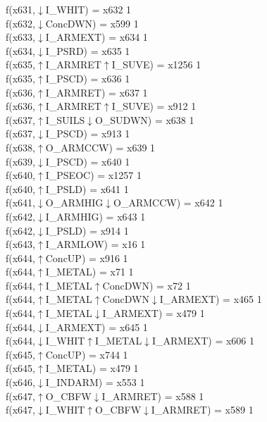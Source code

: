 f(x631,$\downarrow$I\_WHIT) = x632 {1} \\
f(x632,$\downarrow$ConcDWN) = x599 {1} \\
f(x633,$\downarrow$I\_ARMEXT) = x634 {1} \\
f(x634,$\downarrow$I\_PSRD) = x635 {1} \\
f(x635,$\uparrow$I\_ARMRET$\uparrow$I\_SUVE) = x1256 {1} \\
f(x635,$\uparrow$I\_PSCD) = x636 {1} \\
f(x636,$\uparrow$I\_ARMRET) = x637 {1} \\
f(x636,$\uparrow$I\_ARMRET$\uparrow$I\_SUVE) = x912 {1} \\
f(x637,$\uparrow$I\_SUILS$\downarrow$O\_SUDWN) = x638 {1} \\
f(x637,$\downarrow$I\_PSCD) = x913 {1} \\
f(x638,$\uparrow$O\_ARMCCW) = x639 {1} \\
f(x639,$\downarrow$I\_PSCD) = x640 {1} \\
f(x640,$\uparrow$I\_PSEOC) = x1257 {1} \\
f(x640,$\uparrow$I\_PSLD) = x641 {1} \\
f(x641,$\downarrow$O\_ARMHIG$\downarrow$O\_ARMCCW) = x642 {1} \\
f(x642,$\downarrow$I\_ARMHIG) = x643 {1} \\
f(x642,$\downarrow$I\_PSLD) = x914 {1} \\
f(x643,$\uparrow$I\_ARMLOW) = x16 {1} \\
f(x644,$\uparrow$ConcUP) = x916 {1} \\
f(x644,$\uparrow$I\_METAL) = x71 {1} \\
f(x644,$\uparrow$I\_METAL$\uparrow$ConcDWN) = x72 {1} \\
f(x644,$\uparrow$I\_METAL$\uparrow$ConcDWN$\downarrow$I\_ARMEXT) = x465 {1} \\
f(x644,$\uparrow$I\_METAL$\downarrow$I\_ARMEXT) = x479 {1} \\
f(x644,$\downarrow$I\_ARMEXT) = x645 {1} \\
f(x644,$\downarrow$I\_WHIT$\uparrow$I\_METAL$\downarrow$I\_ARMEXT) = x606 {1} \\
f(x645,$\uparrow$ConcUP) = x744 {1} \\
f(x645,$\uparrow$I\_METAL) = x479 {1} \\
f(x646,$\downarrow$I\_INDARM) = x553 {1} \\
f(x647,$\uparrow$O\_CBFW$\downarrow$I\_ARMRET) = x588 {1} \\
f(x647,$\downarrow$I\_WHIT$\uparrow$O\_CBFW$\downarrow$I\_ARMRET) = x589 {1} \\
